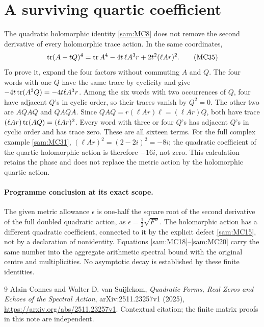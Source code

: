 \documentclass[11pt]{article}
\begin{document}
\section{A surviving quartic coefficient}

The quadratic holomorphic identity \eqref{sam:MC8} does not remove the second
derivative of every holomorphic trace action. In the same coordinates,
\begin{equation}
 \operatorname{tr}(A-tQ)^4
   =\operatorname{tr} A^4-4t\,\ell A^3r+2t^2(\ell Ar)^2.
 \tag{MC35}\label{sam:MC35}
\end{equation}
To prove it, expand the four factors without commuting \(A\) and \(Q\).
The four words with one \(Q\) have the same trace by cyclicity and give
\(-4t\operatorname{tr}(A^3Q)=-4t\ell A^3r\).
Among the six words with two occurrences of \(Q\), four have adjacent
\(Q\)'s in cyclic order, so their traces vanish by \(Q^2=0\).
The other two are \(AQAQ\) and \(QAQA\). Since
\(QAQ=r(\ell Ar)\ell=(\ell Ar)Q\), both have trace
\((\ell Ar)\operatorname{tr}(AQ)=(\ell Ar)^2\).
Every word with three or four \(Q\)'s has adjacent \(Q\)'s in cyclic
order and has trace zero. These are all sixteen terms.
For the full complex example \eqref{sam:MC31},
\((\ell Ar)^2=(2-2i)^2=-8i\); the quadratic coefficient of the
quartic holomorphic action is therefore \(-16i\), not zero.
This calculation retains the phase and does not replace the metric
action by the holomorphic quartic action.

\paragraph{Programme conclusion at its exact scope.}
The given metric allowance \(\epsilon\) is one-half the square root of
the second derivative of the full doubled quadratic action, as
\(\epsilon=\tfrac12\sqrt{F''}\). The holomorphic action has a different
quadratic coefficient, connected to it by the explicit defect
\eqref{sam:MC15}, not by a declaration of nonidentity. Equations
\eqref{sam:MC18}--\eqref{sam:MC20} carry the same number into the aggregate
arithmetic spectral bound with the original centre and multiplicities.
No asymptotic decay is established by these finite identities.

\begin{thebibliography}{9}
Alain Connes and Walter D. van Suijlekom,
\emph{Quadratic Forms, Real Zeros and Echoes of the Spectral Action},
arXiv:2511.23257v1 (2025),
\url{https://arxiv.org/abs/2511.23257v1}.
Contextual citation; the finite matrix proofs in this note are independent.
\end{thebibliography}
\end{document}
